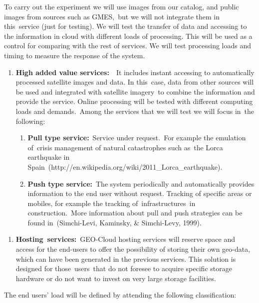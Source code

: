 \documentclass[a4paper]{article}
\newcounter{saveenum}
\newcommand\liststyleLFOxxxiii{%
\renewcommand\theenumi{\arabic{enumi}}
\renewcommand\theenumii{\alph{enumii}}
\renewcommand\theenumiii{\roman{enumiii}}
\renewcommand\theenumiv{\arabic{enumiv}}
\renewcommand\labelenumi{\theenumi.}
\renewcommand\labelenumii{\theenumii.}
\renewcommand\labelenumiii{\theenumiii.}
\renewcommand\labelenumiv{\theenumiv.}
}
\begin{document}
\bigskip

To carry out the experiment we will use images from our catalog, and
public images from sources such as GMES,\ but we will not integrate
them in this\ service (just for testing). We will test the transfer of
data and accessing to the information in cloud with different loads of
processing. This will be used as a control for comparing with the rest
of services. We will test processing loads and timing to measure the
response of the system.


\bigskip

\liststyleLFOxxxiii
\setcounter{saveenum}{\value{enumi}}
\begin{enumerate}
\setcounter{enumi}{\value{saveenum}}
\item \textbf{High added value services:}\ \ It includes instant
accessing to automatically processed satellite images and data. In
this\ case, data from other sources will be used and integrated with
satellite imagery\ to combine the information and provide the service.
Online processing will be tested with different computing loads and
demands.\ Among the services that we will test we will focus in\ the
following:

\setcounter{saveenum}{\value{enumii}}
\begin{enumerate}
\setcounter{enumii}{\value{saveenum}}
\item \textbf{Pull type service:}\ Service under request.\ For example
the emulation of\ crisis management of natural catastrophes such
as\ the Lorca earthquake in
Spain\ (http://en.wikipedia.org/wiki/2011\_Lorca\_earthquake).\ 
\item \textbf{Push type service:}\ The system periodically and
automatically provides information to the end user without request.
Tracking of specific areas or mobiles, for example the tracking
of\ infrastructures\ in construction.\ More information about pull and
push strategies can be found in\ (Simchi-Levi, Kaminsky, \&
Simchi-Levy, 1999).
\end{enumerate}
\end{enumerate}

\bigskip

\liststyleLFOxxxiii
\setcounter{saveenum}{\value{enumi}}
\begin{enumerate}
\setcounter{enumi}{\value{saveenum}}
\item \textbf{Hosting}\textbf{\ services}\textbf{:}\ GEO-Cloud hosting
services will reserve space and access for the end-users to offer the
possibility of storing their own geo-data, which can have been
generated in the previous services. This solution is designed for
those\ users\ that do not foresee to acquire specific storage hardware
or do not want to invest on very large storage facilities.
\end{enumerate}
The end users{\textquoteright} load will be defined by attending the
following classification:
\end{document}
